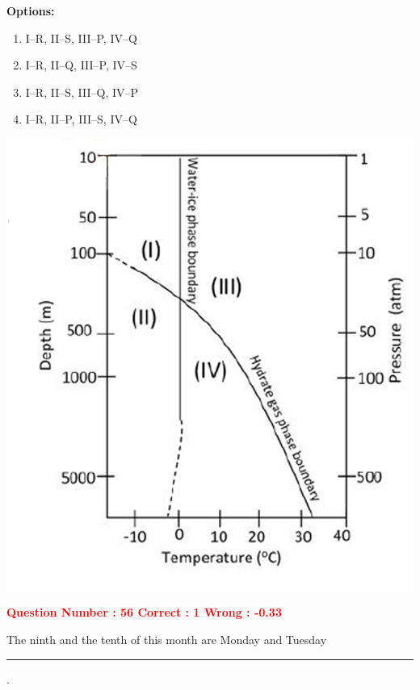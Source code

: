 \documentclass[12pt]{article}
\begin{document}
{\begin{minipage}{0.58\textwidth}
\textbf{Options:}
\begin{enumerate}[label=(\Alph*)]
  \item I–R, II–S, III–P, IV–Q  
  \item I–R, II–Q, III–P, IV–S  
  \item I–R, II–S, III–Q, IV–P  
  \item I–R, II–P, III–S, IV–Q  
\end{enumerate}
\end{minipage}
\hfill
\begin{minipage}{0.4\textwidth}
\begin{flushright}
\includegraphics[width=\linewidth]{Figs/Graph_Q55.png} 

\end{flushright}
\end{minipage}

\newpage

\textcolor{red}{\textbf{Question Number : 56 \hfill Correct : 1  Wrong : -0.33}}

\vspace{0.5em}

The ninth and the tenth of this month are Monday and Tuesday \rule{2cm}{0.4pt}.

}
\end{document}
